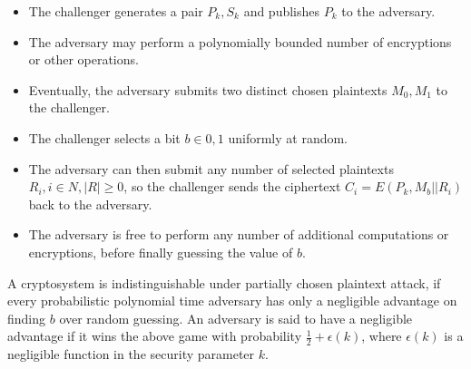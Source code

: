 \begin{itemize} \item The challenger generates a pair \begin{math}P_k,
S_k\end{math} and publishes \begin{math}P_k\end{math} to the adversary.  \item
The adversary may perform a polynomially bounded number of encryptions or other
operations.  \item Eventually, the adversary submits two distinct chosen
plaintexts \begin{math}M_0, M_1\end{math} to the challenger.  \item The
challenger selects a bit \begin{math}b\in{0, 1}\end{math} uniformly at random.
\item The adversary can then submit any number of selected plaintexts
\begin{math}R_i, i\in N, |R| \geq 0\end{math}, so the challenger sends the
ciphertext \begin{math}C_i = E(P_k, M_b||R_i)\end{math} back to the adversary.
\item The adversary is free to perform any number of additional computations or
encryptions, before finally guessing the value of \begin{math}b\end{math}.
\end{itemize}

A cryptosystem is indistinguishable under partially chosen plaintext attack, if
every probabilistic polynomial time adversary has only a negligible advantage on
finding \begin{math}b\end{math} over random guessing. An adversary is said to
have a negligible advantage if it wins the above game with probability
\begin{math}\frac{1}{2} + \epsilon(k)\end{math}, where
\begin{math}\epsilon(k)\end{math} is a negligible function in the security
parameter \begin{math}k\end{math}.

